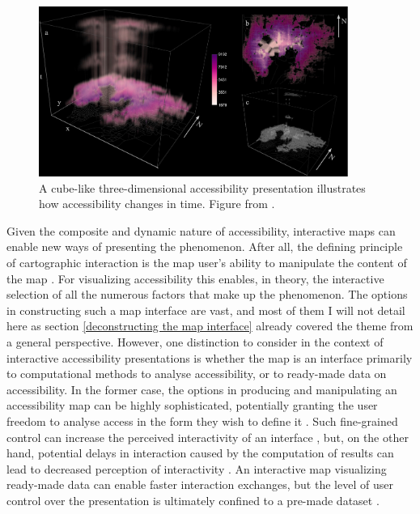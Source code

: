 \begin{figure}[H]
	\centering
	\includegraphics[width=0.9\textwidth]{visual/figures/screenshots/accessibility_cube}
	\caption{
		A cube-like three-dimensional accessibility presentation
		illustrates how accessibility changes in time.
		Figure from \textcite{hu2019}.
	}
	\label{fig:accessibility cube}
\end{figure}




Given the composite and dynamic nature of accessibility,
interactive maps can enable new ways of presenting the phenomenon.
After all, the defining principle of cartographic interaction is
the map user's ability to manipulate the content of the map \parencite{rot2013b}.
For visualizing accessibility this enables, in theory,
the interactive selection of all the numerous factors that make up the phenomenon.
The options in constructing such a map interface are vast,
and most of them I will not detail here as section
\ref{deconstructing the map interface}
already covered the theme from a general perspective.
However, one distinction to consider
in the context of interactive accessibility presentations
is whether the map is an interface primarily to
computational methods to analyse accessibility,
or to ready-made data on accessibility.
In the former case, the options in producing and manipulating an accessibility map
can be highly sophisticated,
potentially granting the user freedom to
analyse access in the form they wish to define it .
Such fine-grained control can increase the perceived interactivity of an interface
\parencite{mac2002},
but, on the other hand,
potential delays in interaction caused by the computation of results
can lead to decreased perception of interactivity \parencite{car1980}.
An interactive map visualizing ready-made data can
enable faster interaction exchanges,
but the level of user control over the presentation
is ultimately confined to a pre-made dataset .


